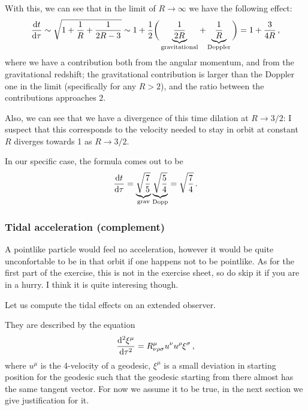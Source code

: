 \documentclass[main.tex]{subfiles}
\begin{document}
With this, we can see that in the limit of \(R \rightarrow \infty\) we have the following effect: 
%
\begin{align}
  \dv{t}{\tau } \sim \sqrt{1 + \frac{1}{R} + \frac{1}{2R-3} }
  \sim 1 + \frac{1}{2} \bigg( \underbrace{\frac{1}{2R}}_{\text{gravitational}} + \underbrace{\frac{1}{R}}_{\text{Doppler}} \bigg)  = 1 + \frac{3}{4R}
\,,
\end{align}
%
where we have a contribution both from the angular momentum, and from the gravitational redshift; the gravitational contribution is larger than the Doppler one in the limit (specifically for any \(R>2\)), and the ratio between the contributions approaches \(2\).

Also, we can see that we have a divergence of this time dilation at \(R \rightarrow 3/2\): 
I suspect that this corresponds to the velocity needed to stay in orbit at constant \(R\) diverges towards 1 as \(R \rightarrow 3/2\).

In our specific case, the formula comes out to be 
%
\begin{align}
  \dv{t}{\tau } = \underbrace{\sqrt{\frac{7}{5}}}_{\text{grav}} \underbrace{\sqrt{\frac{5}{4}}}_{\text{Dopp}} = \sqrt{\frac{7}{4}}
\,.
\end{align}

\subsubsection{Tidal acceleration (complement)}

A pointlike particle would feel no acceleration, however it would be quite unconfortable to be in that orbit if one happens not to be pointlike. 
As for the first part of the exercise, this is not in the exercise sheet, so do skip it if you are in a hurry. I think it is quite interesing though.

Let us compute the tidal effects on an extended observer. 

They are described by the equation 
%
\begin{align}
  \dv[2]{\xi^{\mu }}{\tau } = R^{\mu }_{\nu \rho \sigma } u^{\nu } u^{\rho } \xi^{\sigma }
\,,
\end{align}
%
where \(u^{\mu }\) is the 4-velocity of a geodesic, \(\xi^{ \mu } \) is a small deviation in starting position for the geodesic such that the geodesic starting from there almost has the same tangent vector. For now we assume it to be true, in the next section we give justification for it. 
\end{document}
